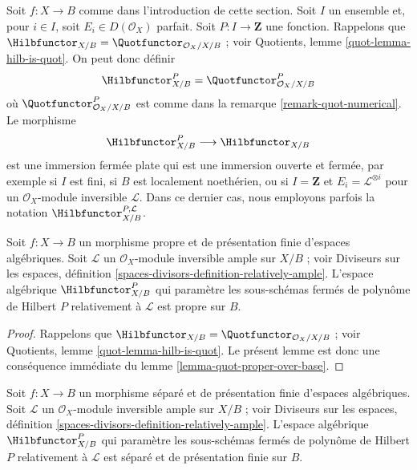 \begin{remark}
\label{remark-hilb-numerical}
Soit $f : X \to B$ comme dans l'introduction de cette section.
Soit $I$ un ensemble et, pour $i \in I$, soit
$E_i \in D(\mathcal{O}_X)$ parfait. Soit
$P : I \to \mathbf{Z}$ une fonction. Rappelons que
$\Hilbfunctor_{X/B} = \Quotfunctor_{\mathcal{O}_X/X/B}$ ; voir Quotients,
lemme \ref{quot-lemma-hilb-is-quot}. On peut donc définir
$$
\Hilbfunctor^P_{X/B} = \Quotfunctor^P_{\mathcal{O}_X/X/B}
$$
où $\Quotfunctor^P_{\mathcal{O}_X/X/B}$ est comme dans la remarque
\ref{remark-quot-numerical}. Le morphisme
$$
\Hilbfunctor^P_{X/B} \longrightarrow \Hilbfunctor_{X/B}
$$
est une immersion fermée plate qui est une immersion ouverte et fermée,
par exemple si $I$ est fini, si $B$ est localement noethérien, ou si
$I = \mathbf{Z}$ et $E_i = \mathcal{L}^{\otimes i}$ pour un
$\mathcal{O}_X$-module inversible $\mathcal{L}$. Dans ce dernier cas, nous
employons parfois la notation $\Hilbfunctor^{P, \mathcal{L}}_{X/B}$.
\end{remark}

\begin{lemma}
\label{lemma-hilb-proper-over-base}
Soit $f : X \to B$ un morphisme propre et de présentation finie d'espaces
algébriques. Soit $\mathcal{L}$ un $\mathcal{O}_X$-module inversible ample
sur $X/B$ ; voir Diviseurs sur les espaces, définition
\ref{spaces-divisors-definition-relatively-ample}.
L'espace algébrique $\Hilbfunctor^P_{X/B}$ qui paramètre les sous-schémas
fermés de polynôme de Hilbert $P$ relativement à $\mathcal{L}$ est propre
sur $B$.
\end{lemma}

\begin{proof}
Rappelons que
$\Hilbfunctor_{X/B} = \Quotfunctor_{\mathcal{O}_X/X/B}$ ; voir Quotients,
lemme \ref{quot-lemma-hilb-is-quot}.
Le présent lemme est donc une conséquence immédiate du lemme
\ref{lemma-quot-proper-over-base}.
\end{proof}

\begin{lemma}
\label{lemma-hilb-qc-over-base}
Soit $f : X \to B$ un morphisme séparé et de présentation finie d'espaces
algébriques. Soit $\mathcal{L}$ un $\mathcal{O}_X$-module inversible ample
sur $X/B$ ; voir Diviseurs sur les espaces, définition
\ref{spaces-divisors-definition-relatively-ample}.
L'espace algébrique $\Hilbfunctor^P_{X/B}$ qui paramètre les sous-schémas
fermés de polynôme de Hilbert $P$ relativement à $\mathcal{L}$ est séparé
et de présentation finie sur $B$.
\end{lemma}

